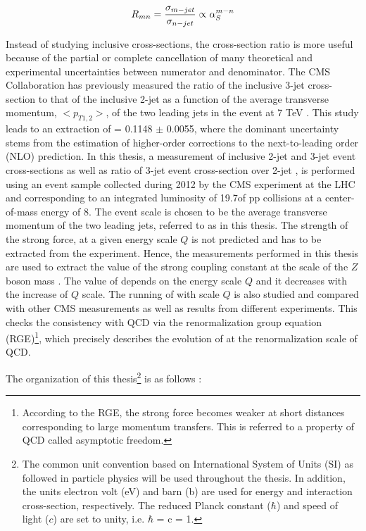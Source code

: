 \begin{equation}
R_{mn} = \frac{\sigma_{m-jet}}{\sigma_{n-jet}} \propto \alps^{m-n}
\label{eq:ratio_mn}
\end{equation}

Instead of studying inclusive cross-sections, the cross-section ratio is more useful because of the partial or complete cancellation of many theoretical and experimental uncertainties between numerator and denominator. The CMS Collaboration has previously measured the ratio of the inclusive 3-jet cross-section to that of the inclusive 2-jet as a function of the average transverse momentum, $<p_{T1,2}>$, of the two leading jets in the event at 7 TeV \cite {Chatrchyan:2013txa}. This study leads to an extraction of \alpsmz = 0.1148 $\pm$ 0.0055, where the dominant uncertainty stems from the estimation of higher-order corrections to the next-to-leading order (NLO) prediction. In this thesis, a measurement of inclusive 2-jet and 3-jet event cross-sections as well as ratio of 3-jet event cross-section over 2-jet \rations, is performed using an event sample collected during 2012 by the CMS experiment at the LHC and corresponding to an integrated luminosity of 19.7\fbinv of pp collisions at a center-of-mass energy of 8\TeV. The event scale is chosen to be the average transverse momentum of the two leading jets, referred to as \httwo in this thesis. The strength of the strong force, \alps at a given energy scale $Q$ is not predicted and has to be extracted from the experiment. Hence, the measurements performed in this thesis are used to extract the value of the strong coupling constant at the scale of the $Z$ boson mass \alpsmz. The value of \alps depends on the energy scale $Q$ and it decreases with the increase of $Q$ scale. The running of \alps with scale $Q$ is also studied and compared with other CMS measurements as well as results from different experiments. This checks the consistency with QCD via the renormalization group equation (RGE)\footnote{According to the RGE, the strong force becomes weaker at short distances corresponding to large momentum transfers. This is referred to a property of QCD called asymptotic freedom.}, which precisely describes the evolution of \alps at the renormalization scale of QCD. 

The organization of this thesis\footnote{The common unit convention based on International System of Units (SI) as followed in particle physics will be used throughout the thesis. In addition, the units electron volt (eV) and barn (b) are used for energy and interaction cross-section, respectively. The reduced Planck constant ($\hbar$) and speed of light ($c$) are set to unity, i.e. $\hbar$ = c = 1.} is as follows :

